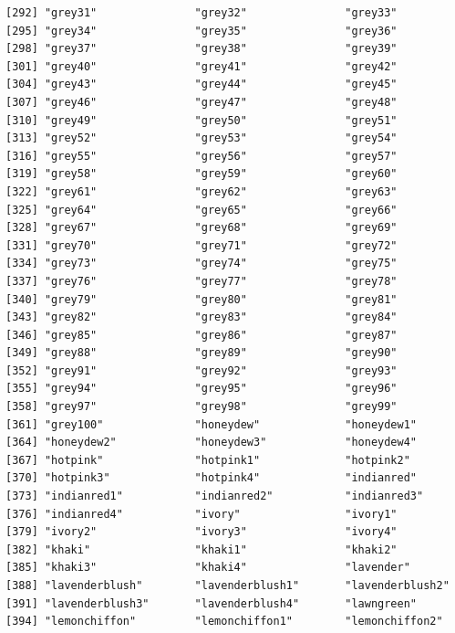 \documentclass[a4paperpaper,]{article}
\theoremstyle{definition}
\theoremstyle{definition}
\theoremstyle{definition}
\theoremstyle{remark}
\begin{document}
\begin{verbatim}
[292] "grey31"               "grey32"               "grey33"              
[295] "grey34"               "grey35"               "grey36"              
[298] "grey37"               "grey38"               "grey39"              
[301] "grey40"               "grey41"               "grey42"              
[304] "grey43"               "grey44"               "grey45"              
[307] "grey46"               "grey47"               "grey48"              
[310] "grey49"               "grey50"               "grey51"              
[313] "grey52"               "grey53"               "grey54"              
[316] "grey55"               "grey56"               "grey57"              
[319] "grey58"               "grey59"               "grey60"              
[322] "grey61"               "grey62"               "grey63"              
[325] "grey64"               "grey65"               "grey66"              
[328] "grey67"               "grey68"               "grey69"              
[331] "grey70"               "grey71"               "grey72"              
[334] "grey73"               "grey74"               "grey75"              
[337] "grey76"               "grey77"               "grey78"              
[340] "grey79"               "grey80"               "grey81"              
[343] "grey82"               "grey83"               "grey84"              
[346] "grey85"               "grey86"               "grey87"              
[349] "grey88"               "grey89"               "grey90"              
[352] "grey91"               "grey92"               "grey93"              
[355] "grey94"               "grey95"               "grey96"              
[358] "grey97"               "grey98"               "grey99"              
[361] "grey100"              "honeydew"             "honeydew1"           
[364] "honeydew2"            "honeydew3"            "honeydew4"           
[367] "hotpink"              "hotpink1"             "hotpink2"            
[370] "hotpink3"             "hotpink4"             "indianred"           
[373] "indianred1"           "indianred2"           "indianred3"          
[376] "indianred4"           "ivory"                "ivory1"              
[379] "ivory2"               "ivory3"               "ivory4"              
[382] "khaki"                "khaki1"               "khaki2"              
[385] "khaki3"               "khaki4"               "lavender"            
[388] "lavenderblush"        "lavenderblush1"       "lavenderblush2"      
[391] "lavenderblush3"       "lavenderblush4"       "lawngreen"           
[394] "lemonchiffon"         "lemonchiffon1"        "lemonchiffon2"       

\end{verbatim}
\end{document}
